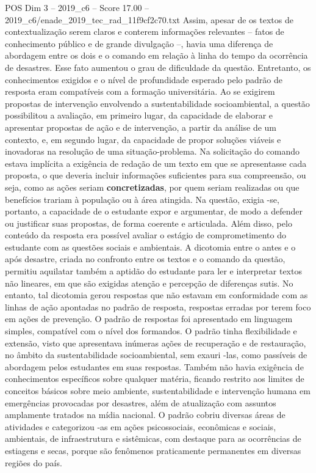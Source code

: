 \begin{textsample}{POS Dim 3 – 2019\_c6 – Score 17.00 – 2019\_c6/enade\_2019\_tec\_rad\_11f9cf2c70.txt}
Assim, apesar de os textos de contextualização serem claros e conterem informações relevantes – fatos de conhecimento público e de grande divulgação –, havia uma diferença de abordagem entre os dois e o comando em relação à linha do tempo da ocorrência de desastres.
Esse fato aumentou o grau de dificuldade da questão.
Entretanto, os conhecimentos exigidos e o nível de profundidade esperado pelo padrão de resposta eram compatíveis com a formação universitária.
Ao se exigirem propostas de intervenção envolvendo a sustentabilidade socioambiental, a questão possibilitou a avaliação, em primeiro lugar, da capacidade de elaborar e apresentar propostas de ação e de intervenção, a partir da análise de um contexto, e, em segundo lugar, da capacidade de propor soluções viáveis e inovadoras na resolução de uma situação-problema.
Na solicitação do comando estava implícita a exigência de redação de um texto em que se apresentasse cada proposta, o que deveria incluir informações suficientes para sua compreensão, ou seja, como as ações seriam \textbf{concretizadas}, por quem seriam realizadas ou que benefícios trariam à população ou à área atingida.
Na questão, exigia -se, portanto, a capacidade de o estudante expor e argumentar, de modo a defender ou justificar suas propostas, de forma coerente e articulada.
Além disso, pelo conteúdo da resposta era possível avaliar o estágio de comprometimento do estudante com as questões sociais e ambientais.
A dicotomia entre o antes e o após desastre, criada no confronto entre os textos e o comando da questão, permitiu aquilatar também a aptidão do estudante para ler e interpretar textos não lineares, em que são exigidas atenção e percepção de diferenças sutis.
No entanto, tal dicotomia gerou respostas que não estavam em conformidade com as linhas de ação apontadas no padrão de resposta, respostas erradas por terem foco em ações de prevenção.
O padrão de respostas foi apresentado em linguagem simples, compatível com o nível dos formandos.
O padrão tinha flexibilidade e extensão, visto que apresentava inúmeras ações de recuperação e de restauração, no âmbito da sustentabilidade socioambiental, sem exauri -las, como passíveis de abordagem pelos estudantes em suas respostas.
Também não havia exigência de conhecimentos específicos sobre qualquer matéria, ficando restrito aos limites de conceitos básicos sobre meio ambiente, sustentabilidade e intervenção humana em emergências provocadas por desastres, além de atualização com assuntos amplamente tratados na mídia nacional.
O padrão cobriu diversas áreas de atividades e categorizou -as em ações psicossociais, econômicas e sociais, ambientais, de infraestrutura e sistêmicas, com destaque para as ocorrências de estiagens e secas, porque são fenômenos praticamente permanentes em diversas regiões do país.

\end{textsample}
